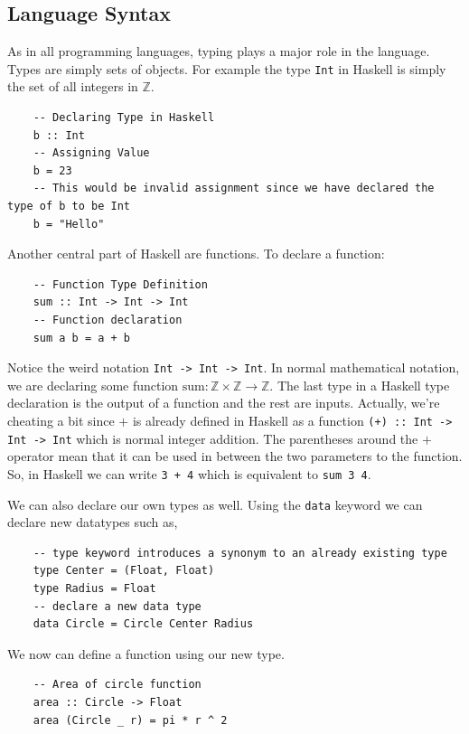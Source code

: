 \subsection{Language Syntax}
As in all programming languages, typing plays a major role in the language. Types are simply sets of objects. For example the type \lstinline{Int} in Haskell is simply the set of all integers in $\mathbb{Z}$.

\begin{lstlisting}
    -- Declaring Type in Haskell
    b :: Int
    -- Assigning Value
    b = 23
    -- This would be invalid assignment since we have declared the type of b to be Int
    b = "Hello"
\end{lstlisting}

Another central part of Haskell are functions. To declare a function:

\begin{lstlisting}
    -- Function Type Definition
    sum :: Int -> Int -> Int
    -- Function declaration
    sum a b = a + b
\end{lstlisting}

Notice the weird notation \lstinline{Int -> Int -> Int}. In normal mathematical notation, we are declaring some function $\text{sum}: \mathbb{Z} \times \mathbb{Z} \rightarrow \mathbb{Z}$. The last type in a Haskell type declaration is the output of a function and the rest are inputs. Actually, we're cheating a bit since $+$ is already defined in Haskell as a function \lstinline{(+) :: Int -> Int -> Int} which is normal integer addition. The parentheses around the $+$ operator mean that it can be used in between the two parameters to the function. So, in Haskell we can write \lstinline{3 + 4} which is equivalent to \lstinline{sum 3 4}. 

We can also declare our own types as well. Using the \lstinline{data} keyword we can declare new datatypes such as,

\begin{lstlisting}
    -- type keyword introduces a synonym to an already existing type    
    type Center = (Float, Float)
    type Radius = Float
    -- declare a new data type
    data Circle = Circle Center Radius
\end{lstlisting}

We now can define a function using our new type.
\begin{lstlisting}
    -- Area of circle function
    area :: Circle -> Float
    area (Circle _ r) = pi * r ^ 2
\end{lstlisting}

